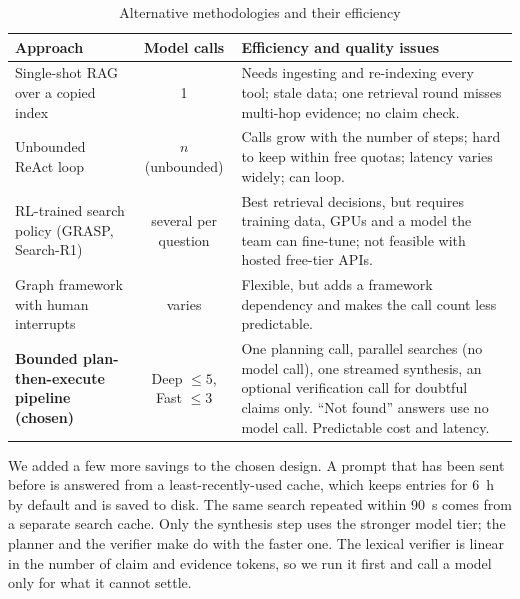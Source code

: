 \documentclass[oneside,a4paper,12pt]{report}
\begin{document}
\begin{table}[!htbp]
\begin{center}
\def\arraystretch{1.3}
\small
\begin{tabularx}{\textwidth}{| p{3.2cm} | c | X |}
\hline
Approach & Model calls & Efficiency and quality issues \\ \hline
Single-shot RAG over a copied index & 1 & Needs ingesting and re-indexing every tool; stale data; one retrieval round misses multi-hop evidence; no claim check. \\ \hline
Unbounded ReAct loop & $n$ (unbounded) & Calls grow with the number of steps; hard to keep within free quotas; latency varies widely; can loop. \\ \hline
RL-trained search policy (GRASP, Search-R1) & several per question & Best retrieval decisions, but requires training data, GPUs and a model the team can fine-tune; not feasible with hosted free-tier APIs. \\ \hline
Graph framework with human interrupts & varies & Flexible, but adds a framework dependency and makes the call count less predictable. \\ \hline
\textbf{Bounded plan-then-execute pipeline (chosen)} & Deep $\le 5$, Fast $\le 3$ & One planning call, parallel searches (no model call), one streamed synthesis, an optional verification call for doubtful claims only. ``Not found'' answers use no model call. Predictable cost and latency. \\ \hline
\end{tabularx}
\end{center}
\caption{Alternative methodologies and their efficiency}
\label{tab:approaches}
\end{table}

We added a few more savings to the chosen design. A prompt that has been sent before is answered from a least-recently-used cache, which keeps entries for 6~h by default and is saved to disk. The same search repeated within 90~s comes from a separate search cache. Only the synthesis step uses the stronger model tier; the planner and the verifier make do with the faster one. The lexical verifier is linear in the number of claim and evidence tokens, so we run it first and call a model only for what it cannot settle.
\end{document}
